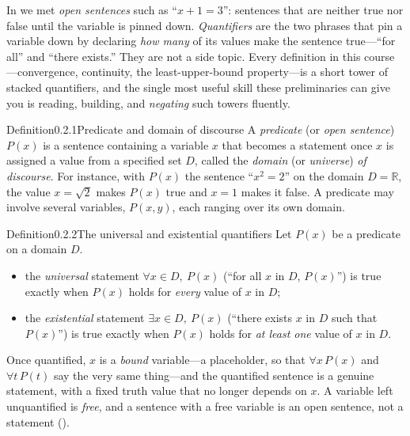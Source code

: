 \documentclass[main.tex]{subfiles}
\begin{document}
\clearpage

\noindent In  we met \emph{open sentences} such as ``$x+1=3$'': sentences that are
neither true nor false until the variable is pinned down. \emph{Quantifiers} are the two phrases that
pin a variable down by declaring \emph{how many} of its values make the sentence true---``for all''
and ``there exists.'' They are not a side topic. Every definition in this course---convergence,
continuity, the least-upper-bound property---is a short tower of stacked quantifiers, and the single
most useful skill these preliminaries can give you is reading, building, and \emph{negating} such towers
fluently.

\begin{Obj}{Definition}{0.2.1}{Predicate and domain of discourse}
A \emph{predicate} (or \emph{open sentence}) $P(x)$ is a sentence containing a variable $x$ that
becomes a statement once $x$ is assigned a value from a specified set $D$, called the \emph{domain}
(or \emph{universe}) \emph{of discourse}. For instance, with $P(x)$ the sentence ``$x^2=2$'' on the
domain $D=\mathbb R$, the value $x=\sqrt2$ makes $P(x)$ true and $x=1$ makes it false. A predicate may
involve several variables, $P(x,y)$, each ranging over its own domain.
\end{Obj}

\begin{Obj}{Definition}{0.2.2}{The universal and existential quantifiers}
Let $P(x)$ be a predicate on a domain $D$.
\begin{itemize}
  \item the \emph{universal} statement $\forall x\in D,\ P(x)$ (``for all $x$ in $D$, $P(x)$'') is
        true exactly when $P(x)$ holds for \emph{every} value of $x$ in $D$;
  \item the \emph{existential} statement $\exists x\in D,\ P(x)$ (``there exists $x$ in $D$ such that
        $P(x)$'') is true exactly when $P(x)$ holds for \emph{at least one} value of $x$ in $D$.
\end{itemize}
Once quantified, $x$ is a \emph{bound} variable---a placeholder, so that $\forall x\,P(x)$ and
$\forall t\,P(t)$ say the very same thing---and the quantified sentence is a genuine statement, with a
fixed truth value that no longer depends on $x$. A variable left unquantified is \emph{free}, and a
sentence with a free variable is an open sentence, not a statement ().
\end{Obj}
\end{document}
